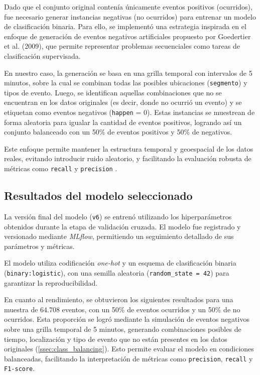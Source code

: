 \documentclass[12pt]{article}
\begin{document}
Dado que el conjunto original contenía únicamente eventos positivos (ocurridos), fue necesario generar instancias negativas (no ocurridos) para entrenar un modelo de clasificación binaria. Para ello, se implementó una estrategia inspirada en el enfoque de generación de eventos negativos artificiales propuesto por Goedertier et al. (2009), que permite representar problemas secuenciales como tareas de clasificación supervisada.

En nuestro caso, la generación se basa en una grilla temporal con intervalos de 5 minutos, sobre la cual se combinan todas las posibles ubicaciones (\texttt{segmento}) y tipos de evento. Luego, se identifican aquellas combinaciones que no se encuentran en los datos originales (es decir, donde no ocurrió un evento) y se etiquetan como eventos negativos (\texttt{happen} = 0). Estas instancias se muestrean de forma aleatoria para igualar la cantidad de eventos positivos, logrando así un conjunto balanceado con un 50\% de eventos positivos y 50\% de negativos.

Este enfoque permite mantener la estructura temporal y geoespacial de los datos reales, evitando introducir ruido aleatorio, y facilitando la evaluación robusta de métricas como \texttt{recall} y \texttt{precision} \citep{goedertier2009robust}.


\subsection{Resultados del modelo seleccionado}

La versión final del modelo (\texttt{v6}) se entrenó utilizando los hiperparámetros obtenidos durante la etapa de validación cruzada. El modelo fue registrado y versionado mediante \textit{MLflow}, permitiendo un seguimiento detallado de sus parámetros y métricas.

El modelo utiliza codificación \textit{one-hot} y un esquema de clasificación binaria (\texttt{binary:logistic}), con una semilla aleatoria (\texttt{random\_state = 42}) para garantizar la reproducibilidad.


\noindent En cuanto al rendimiento, se obtuvieron los siguientes resultados para una muestra de 64.708 eventos, con un 50\% de eventos ocurridos y un 50\% de no ocurridos. Esta proporción se logró mediante la simulación de eventos negativos sobre una grilla temporal de 5 minutos, generando combinaciones posibles de tiempo, localización y tipo de evento que no están presentes en los datos originales (\cref{ssec:class_balancing}). Esto permite evaluar el modelo en condiciones balanceadas, facilitando la interpretación de métricas como \texttt{precision}, \texttt{recall} y \texttt{F1-score}.
\end{document}
